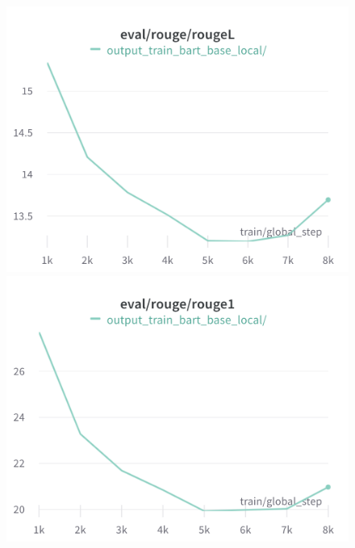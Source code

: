 \documentclass{article}
\begin{document}
\begin{figure}[!htb]
\includegraphics[width=\linewidth]{charts/Section-6-Panel-2-58cklx5fa}
\caption{}
\endminipage\hfill
{}
\includegraphics[width=\linewidth]{charts/Section-6-Panel-3-mu3n5ufdz}
\caption{}
\endminipage
\end{figure}
\end{document}
